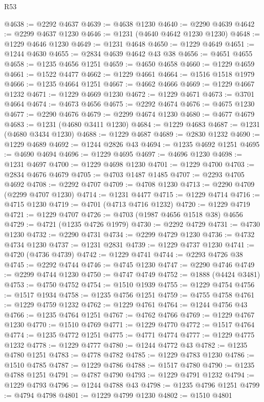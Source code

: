 \begin{lexlean}{R53}
\begin{coremodule}
@4638 := @2292 @4637
@4639 := @4638 @1230
@4640 := @2290 @4639
@4642 := @2299 @4637 @1230
@4646 := @1231 (@4640 @4642 @1230 @1230)
@4648 := @1229 @4646 @1230
@4649 := @1231 @4648
@4650 := @1229 @4649
@4651 := @1244 @4630
@4655 := @2834 @4639 @4642 @43 @38
@4656 := @4651 @4655
@4658 := @1235 @4656 @1251
@4659 := @4650 @4658
@4660 := @1229 @4659
@4661 := @1522 @4477
@4662 := @1229 @4661
@4664 := @1516 @1518 @1979
@4666 := @1235 @4664 @1251
@4667 := @4662 @4666
@4669 := @1229 @4667 @1232
@4671 := @1229 @4669 @1230
@4672 := @1229 @4671
@4673 := @3701 @4664
@4674 := @4673 @4656
@4675 := @2292 @4674
@4676 := @4675 @1230
@4677 := @2290 @4676
@4679 := @2299 @4674 @1230
@4680 := @4677 @4679
@4683 := @1231 (@4680 @3411 @1230)
@4684 := @1229 @4683
@4687 := @1231 (@4680 @3434 @1230)
@4688 := @1229 @4687
@4689 := @2830 @1232
@4690 := @1229 @4689
@4692 := @1244 @2826 @43
@4694 := @1235 @4692 @1251
@4695 := @4690 @4694
@4696 := @1229 @4695
@4697 := @4696 @1230
@4698 := @1231 @4697
@4700 := @1229 @4698 @1230
@4701 := @1229 @4700
@4703 := @2834 @4676 @4679
@4705 := @4703 @1487 @1485
@4707 := @2293 @4705 @4692
@4708 := @2292 @4707
@4709 := @4708 @1230
@4713 := @2290 @4709 (@2299 @4707 @1230)
@4714 := @1231 @4477
@4715 := @1229 @4714
@4716 := @4715 @1230
@4719 := @4701 (@4713 @4716 @1232)
@4720 := @1229 @4719
@4721 := @1229 @4707
@4726 := @4703 (@1987 @4656 @1518 @38) @4656
@4729 := @4721 (@1235 @4726 @1979)
@4730 := @2292 @4729
@4731 := @4730 @1230
@4732 := @2290 @4731
@4734 := @2299 @4729 @1230
@4736 := @4732 @4734 @1230
@4737 := @1231 @2831
@4739 := @1229 @4737 @1230
@4741 := @4720 (@4736 @4739)
@4742 := @1229 @4741
@4744 := @2293 @4726 @38
@4745 := @2292 @4744
@4746 := @4745 @1230
@4747 := @2290 @4746
@4749 := @2299 @4744 @1230
@4750 := @4747 @4749
@4752 := @1888 (@4424 @3481)
@4753 := @4750 @4752
@4754 := @1510 @1939
@4755 := @1229 @4754
@4756 := @1517 @1934
@4758 := @1235 @4756 @1251
@4759 := @4755 @4758
@4761 := @1229 @4759 @1232
@4762 := @1229 @4761
@4764 := @1244 @4756 @43
@4766 := @1235 @4764 @1251
@4767 := @4762 @4766
@4769 := @1229 @4767 @1230
@4770 := @1510 @4769
@4771 := @1229 @4770
@4772 := @1517 @4764
@4774 := @1235 @4772 @1251
@4775 := @4771 @4774
@4777 := @1229 @4775 @1232
@4778 := @1229 @4777
@4780 := @1244 @4772 @43
@4782 := @1235 @4780 @1251
@4783 := @4778 @4782
@4785 := @1229 @4783 @1230
@4786 := @1510 @4785
@4787 := @1229 @4786
@4788 := @1517 @4780
@4790 := @1235 @4788 @1251
@4791 := @4787 @4790
@4793 := @1229 @4791 @1232
@4794 := @1229 @4793
@4796 := @1244 @4788 @43
@4798 := @1235 @4796 @1251
@4799 := @4794 @4798
@4801 := @1229 @4799 @1230
@4802 := @1510 @4801

\end{coremodule}
\end{lexlean}
